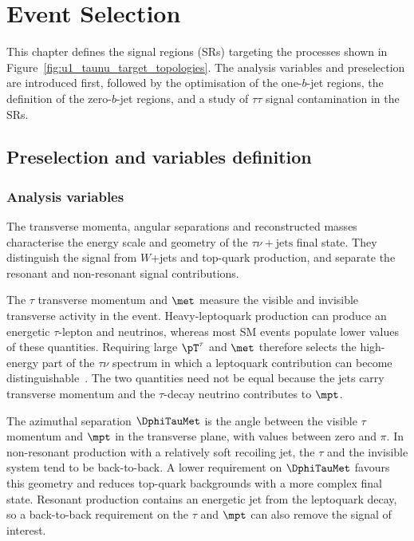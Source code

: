 \chapter{Event Selection}
\label{chapter:event_selection}

This chapter defines the signal regions (SRs) targeting the processes shown in Figure~\ref{fig:u1_taunu_target_topologies}.
The analysis variables and preselection are introduced first, followed by the optimisation of the one-$b$-jet regions, the definition of the zero-$b$-jet regions, and a study of $\tau\tau$ signal contamination in the SRs.

\section{Preselection and variables definition}
\label{sec:ch7_preselection}

\subsection{Analysis variables}
\label{subsec:ch7_variables}

The transverse momenta, angular separations and reconstructed masses characterise the energy scale and geometry of the $\tau\nu+\mathrm{jets}$ final state.
They distinguish the signal from $W$+jets and top-quark production, and separate the resonant and non-resonant signal contributions. 

The $\tau$ transverse momentum and $\met$ measure the visible and invisible transverse activity in the event.
Heavy-leptoquark production can produce an energetic $\tau$-lepton and neutrinos, whereas most SM events populate lower values of these quantities.
    Requiring large $\pT^\tau$ and $\met$ therefore selects the high-energy part of the $\tau\nu$ spectrum in which a leptoquark contribution can become distinguishable~\cite{Endo2022NonResonant}.
    The two quantities need not be equal because the jets carry transverse momentum and the $\tau$-decay neutrino contributes to $\mpt$.

The azimuthal separation $\DphiTauMet$ is the angle between the visible $\tau$ momentum and $\mpt$ in the transverse plane, with values between zero and $\pi$.
    In non-resonant production with a relatively soft recoiling jet, the $\tau$ and the invisible system tend to be back-to-back.
    A lower requirement on $\DphiTauMet$ favours this geometry and reduces top-quark backgrounds with a more complex final state.
    Resonant production contains an energetic jet from the leptoquark decay, so a back-to-back requirement on the $\tau$ and $\mpt$ can also remove the signal of interest.

